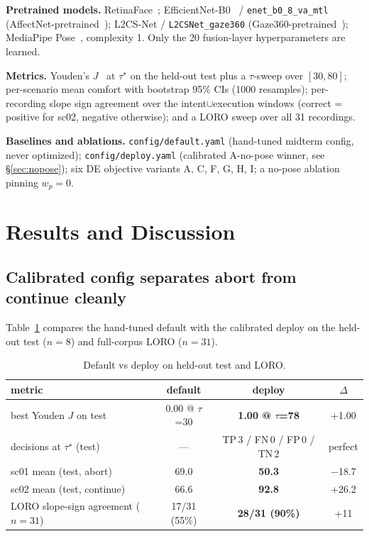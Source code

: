 \documentclass{article}
\newcommand{\code}[1]{\texttt{\small #1}}
\begin{document}
\textbf{Pretrained models.} RetinaFace~\cite{retinaface}; EfficientNet-B0~\cite{efficientnet} / \code{enet\_b0\_8\_va\_mtl} (AffectNet-pretrained~\cite{ref26}); L2CS-Net / \code{L2CSNet\_gaze360} (Gaze360-pretrained~\cite{ref25}); MediaPipe Pose~\cite{mediapipe}, complexity 1. Only the 20 fusion-layer hyperparameters are learned.

\textbf{Metrics.} Youden's $J$~\cite{youden1950} at $\tau^\star$ on the held-out test plus a $\tau$-sweep over $[30, 80]$; per-scenario mean comfort with bootstrap 95\% CIs (1000 resamples); per-recording slope sign agreement over the intent$\cup$execution windows (correct = positive for sc02, negative otherwise); and a LORO sweep over all 31 recordings.

\textbf{Baselines and ablations.} \code{config/default.yaml} (hand-tuned midterm config, never optimized); \code{config/deploy.yaml} (calibrated A-no-pose winner, see \S\ref{sec:nopose}); six DE objective variants A, C, F, G, H, I; a no-pose ablation pinning $w_p = 0$.

\section{Results and Discussion}\label{sec:results}

\subsection{Calibrated config separates abort from continue cleanly}

Table~\ref{tab:headline} compares the hand-tuned default with the calibrated deploy on the held-out test ($n=8$) and full-corpus LORO ($n=31$).

\begin{table}[h]
\centering
\caption{Default vs deploy on held-out test and LORO.}
\label{tab:headline}
\small
\begin{tabular}{@{}lccc@{}}
\toprule
metric & default & deploy & $\Delta$ \\
\midrule
best Youden $J$ on test & 0.00 @ $\tau$=30 & \textbf{1.00 @ $\tau$=78} & +1.00 \\
decisions at $\tau^\star$ (test) & --- & TP\,3 / FN\,0 / FP\,0 / TN\,2 & perfect \\
sc01 mean (test, abort) & 69.0 & \textbf{50.3} & $-$18.7 \\
sc02 mean (test, continue) & 66.6 & \textbf{92.8} & +26.2 \\
LORO slope-sign agreement ($n=31$) & 17/31 (55\%) & \textbf{28/31 (90\%)} & +11 \\
\bottomrule
\end{tabular}
\end{table}
\end{document}
